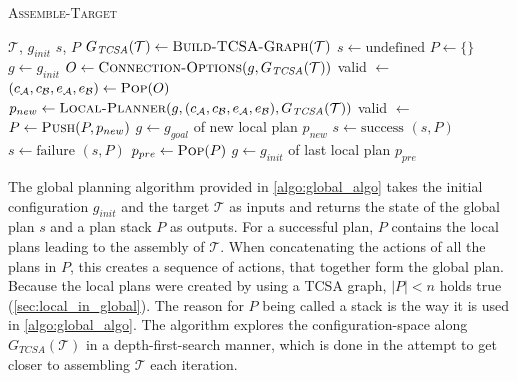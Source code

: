 \begin{algorithm}
	\caption{\scshape Assemble-Target}
	\label{algo:global_algo}
	\begin{algorithmic}[1]
		\REQUIRE $\mathcal{T}$, $g_{init}$ 
		\ENSURE $s$, $P$ 
		\STATE $G_{\textit{TCSA}}(\mathcal{T}) \gets \text{\scshape Build-TCSA-Graph}(\mathcal{T})$
		\STATE $s \gets \text{undefined}$
		\STATE $P \gets \{\}$ 
		\STATE $g \gets g_{init}$ 
		\LOOP
			\STATE $O \gets \text{\scshape Connection-Options}(g, G_{\textit{TCSA}}(\mathcal{T}))$
			\STATE valid $\gets$ \FALSE
				\STATE $(c_\mathcal{A}, c_\mathcal{B}, e_\mathcal{A}, e_\mathcal{B}) \gets \text{\scshape Pop}(O)$
				\STATE $p_{new} \gets \text{\scshape Local-Planner}(g, (c_\mathcal{A}, c_\mathcal{B}, e_\mathcal{A}, e_\mathcal{B}), G_{\textit{TCSA}}(\mathcal{T}))$
					\STATE valid $\gets$ \TRUE
				\ENDIF
			\ENDWHILE
				\STATE $P \gets \text{\scshape Push}(P, p_{new})$ 
				\STATE $g \gets g_{goal}$ of new local plan $p_{new}$ 
					\STATE $s \gets \text{success}$
					\RETURN $(s, P)$
				\ENDIF
			\ELSE
					\STATE $s \gets \text{failure}$
					\RETURN $(s, P)$
				\ENDIF
				\STATE $p_{pre} \gets \text{\scshape Pop}(P)$ 
				\STATE $g \gets g_{init}$ of last local plan $p_{pre}$ 
			\ENDIF
		\ENDLOOP
	\end{algorithmic}
\end{algorithm}

The global planning algorithm provided in \autoref{algo:global_algo} takes the initial configuration $g_{init}$ and the target $\mathcal{T}$ as inputs and returns the state of the global plan $s$ and a plan stack $P$ as outputs.
For a successful plan, $P$ contains the local plans leading to the assembly of $\mathcal{T}$.
When concatenating the actions of all the plans in $P$, this creates a sequence of actions, that together form the global plan.
Because the local plans were created by using a TCSA graph, $|P| < n$ holds true (\autoref{sec:local_in_global}).
The reason for $P$ being called a stack is the way it is used in \autoref{algo:global_algo}.
The algorithm explores the configuration-space along $G_{\textit{TCSA}}(\mathcal{T})$ in a depth-first-search manner, which is done in the attempt to get closer to assembling $\mathcal{T}$ each iteration.

